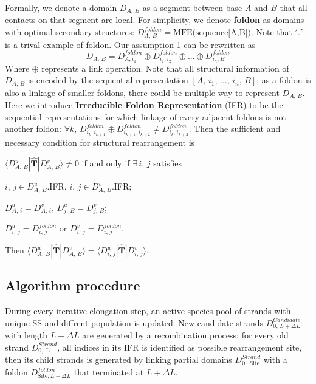 \documentclass[11pt, a4paper]{article}
\begin{document}
Formally, we denote a domain $D_{A,\,B}$ as a segment between base $A$ and $B$ that all contacts on that segment are local. For simplicity, we denote \textbf{foldon}
as domains with optimal secondary structures: $D^{foldon}_{A,\,B} = \text{MFE(sequence[A,B])}$. Note that $'.'$ is a trival example of foldon.
Our assumption 1 can be rewritten as
\begin{equation}
  D_{A,\,B} = D^{foldon}_{A, i_1} \oplus D^{foldon}_{i_1, i_2} \oplus ... \oplus D^{foldon}_{i_n, B}
\end{equation}
Where $\oplus$ represents a link operation. Note that all structural information of $D_{A,\,B}$ is encoded by the sequential representation $[A,\, i_1,\, ...,\, i_n,\, B]$;
 as a foldon is also a linkage of smaller foldons, there could be multiple way to represent $D_{A,\,B}$. Here we introduce \textbf{Irreducible Foldon Representation} (IFR) to be the
 sequential representations for which linkage of every adjacent foldons is not another foldon: $\forall k,\, D^{foldon}_{i_k, i_{k+1}} \oplus D^{foldon}_{i_{k+1}, i_{k+2}} \neq D^{foldon}_{i_{k}, i_{k+2}}$.
 Then the sufficient and necessary condition for structural rearrangement is

\begin{center}
  $\langle D^{u}_{A,\,B} | \hat{\mathbf{T}} | D^{v}_{A,\,B} \rangle \neq 0$ if and only if $\exists\, i,\,j$ satisfies

  $i,\,j \in D^{u}_{A,\,B}$.IFR, $i,\,j \in D^{v}_{A,\,B}$.IFR;

  $D^{u}_{A,\,i} = D^{v}_{A,\,i},\, D^{u}_{j,\,B} = D^{v}_{j,\,B}$;

  $D^{u}_{i,\,j} = D^{foldon}_{i,\,j}$ or $D^{v}_{i,\,j} = D^{foldon}_{i,\,j}$.

  Then $\langle D^{u}_{A,\,B} | \hat{\mathbf{T}} | D^{v}_{A,\,B} \rangle = \langle D^{u}_{i,\,j} | \hat{\mathbf{T}} | D^{v}_{i,\,j} \rangle$.
\end{center}

\subsection{Algorithm procedure}

During every iterative elongation step, an active species pool of strands with unique SS and diffrent population is updated. New candidate strands $D^{Candidate}_{0,\, L+\Delta L}$ with
length $L+\Delta L$ are generated by a recombination
process: for every old strand $D^{Strand}_{0, \text{ L}}$, all indices in its IFR is identified as possible rearrangement site, then its child strands is generated by linking partial domains
$D^{Strand}_{0, \text{ Site}}$ with a foldon $D^{foldon}_{\text{Site}, L+\Delta L}$ that terminated at $L+\Delta L$.
\end{document}
